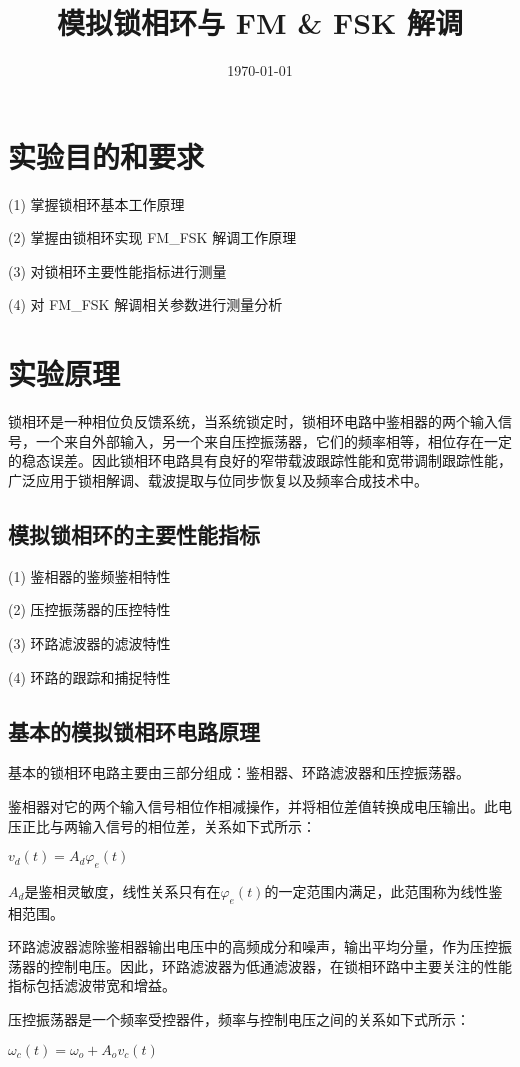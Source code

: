 \documentclass{../source/Experiment}
\title{模拟锁相环与 FM \& FSK 解调}
\date{\today}
\begin{document}
    \section{实验目的和要求}
    (1) 掌握锁相环基本工作原理

    (2) 掌握由锁相环实现 FM\_FSK 解调工作原理

    (3) 对锁相环主要性能指标进行测量

    (4) 对 FM\_FSK 解调相关参数进行测量分析


    \section{实验原理}
    锁相环是一种相位负反馈系统，当系统锁定时，锁相环电路中鉴相器的两个输入信号，一个来自外部输入，另一个来自压控振荡器，它们的频率相等，相位存在一定的稳态误差。因此锁相环电路具有良好的窄带载波跟踪性能和宽带调制跟踪性能，广泛应用于锁相解调、载波提取与位同步恢复以及频率合成技术中。

        \subsection{模拟锁相环的主要性能指标}

        (1) 鉴相器的鉴频鉴相特性

        (2) 压控振荡器的压控特性

        (3) 环路滤波器的滤波特性

        (4) 环路的跟踪和捕捉特性
        \subsection{基本的模拟锁相环电路原理}

        基本的锁相环电路主要由三部分组成：鉴相器、环路滤波器和压控振荡器。

        鉴相器对它的两个输入信号相位作相减操作，并将相位差值转换成电压输出。此电压正比与两输入信号的相位差，关系如下式所示：

        $v_d(t) = A_d\varphi_e (t)$

        $A_d$是鉴相灵敏度，线性关系只有在$\varphi_e(t)$的一定范围内满足，此范围称为线性鉴相范围。

        环路滤波器滤除鉴相器输出电压中的高频成分和噪声，输出平均分量，作为压控振荡器的控制电压。因此，环路滤波器为低通滤波器，在锁相环路中主要关注的性能指标包括滤波带宽和增益。

        压控振荡器是一个频率受控器件，频率与控制电压之间的关系如下式所示：

        $\omega_c(t) = \omega_o + A_o v_c(t)$
\end{document}
